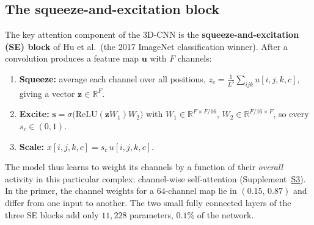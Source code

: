 \documentclass[11pt]{article}
\newcommand{\R}{\mathbb{R}}
\begin{document}
\subsection*{The squeeze-and-excitation block}
The key attention component of the 3D-CNN is the \textbf{squeeze-and-excitation (SE) block} of Hu et al.\ (the 2017 ImageNet classification winner). After a convolution produces a feature map $\mathbf u$ with $F$ channels:
\begin{enumerate}[nosep]
  \item \textbf{Squeeze:} average each channel over all positions, $z_c=\frac1{L^3}\sum_{ijk}u[i,j,k,c]$, giving a vector $\mathbf z\in\R^F$.
  \item \textbf{Excite:} $\mathbf s=\sigma\big(\mathrm{ReLU}(\mathbf zW_1)W_2\big)$ with $W_1\in\R^{F\times F/16}$, $W_2\in\R^{F/16\times F}$, so every $s_c\in(0,1)$.
  \item \textbf{Scale:} $x[i,j,k,c]=s_c\,u[i,j,k,c]$.
\end{enumerate}
The model thus learns to weight its channels by a function of their \emph{overall} activity in this particular complex: channel-wise self-attention (Supplement~\hyperref[sec:S3]{S3}). In the primer, the channel weights for a $64$-channel map lie in $(0.15,\,0.87)$ and differ from one input to another. The two small fully connected layers of the three SE blocks add only $11{,}228$ parameters, $0.1\%$ of the network.
\end{document}
